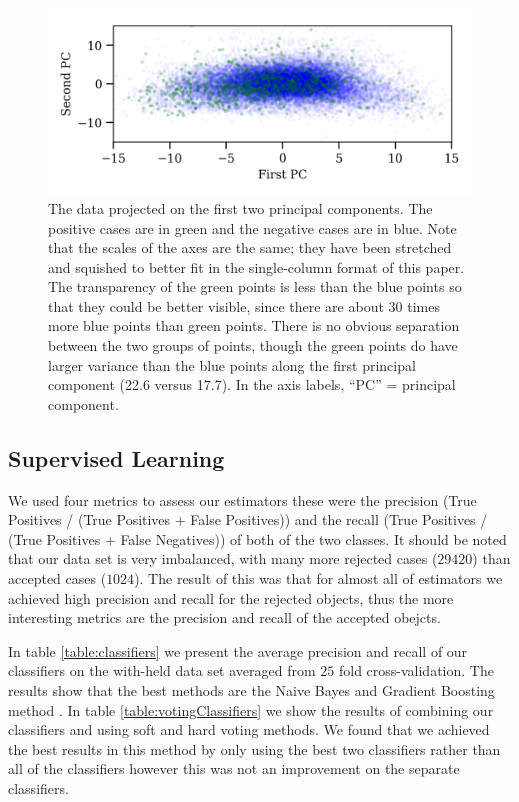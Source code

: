 \begin{figure}
\begin{centering}
\includegraphics[width=5in]{pca.png}
\caption{\label{pca} The data projected on the first two principal components.  The positive cases are in green and the negative cases are in blue.  Note that the scales of the axes are the same; they have been stretched and squished to better fit in the single-column format of this paper.  The transparency of the green points is less than the blue points so that they could be better visible, since there are about 30 times more blue points than green points.  There is no obvious separation between the two groups of points, though the green points do have larger variance than the blue points along the first principal component (22.6 versus 17.7).  In the axis labels, ``PC'' = principal component.}
\end{centering}
\end{figure}







\subsection{Supervised Learning}

We used four metrics to assess our estimators these were the precision (True Positives / (True Positives + False Positives)) and the recall  (True Positives / (True Positives + False Negatives)) of both of the two classes. It should be noted that our data set is very imbalanced, with many more rejected cases ($29420$) than accepted cases ($1024$). The result of this was that for almost all of estimators we achieved high precision and recall for the rejected objects, thus the more interesting metrics are the precision and recall of the accepted obejcts.

In table \ref{table:classifiers} we present the average precision and recall of our classifiers on the with-held data set averaged from $25$ fold cross-validation. The results show that the best methods are the Naive Bayes and Gradient Boosting method . In table \ref{table:votingClassifiers} we show the results of combining our classifiers and using soft and hard voting methods. We found that we achieved the best results in this method by only using the best two classifiers rather than all of the classifiers however this was not an improvement on the separate classifiers.

